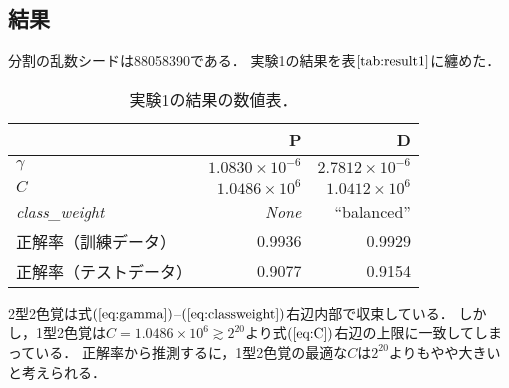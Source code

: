 \documentclass[uplatex,paper=a4,fontsize=4.0truemm,jafontsize=4.0truemm,head_space=30.0truemm,baselineskip=8.0truemm,gutter=25.0truemm,oneside,fleqn,hanging_panctuation,open_bracket_pos=nibu_tentsuki,dvipdfmx,jis2004,book,titlepage]{jlreq}
\theoremstyle{mystyle}
\newcommand{\tableinput}[4]{\begin{table}[tbp]\centering\caption{#3．}\label{tab:#4}\begin{tabular}{#1}#2\end{tabular}\end{table}}
\newcommand{\mathdisplaystyle}[1]{\(\displaystyle{#1}\)}
\newcommand{\Reference}[1]{\mathdisplaystyle{\ref{#1}}}
\newcommand{\Equationreference}[1]{\mathdisplaystyle{\parentheses{\ref{#1}}}}
\newcommand{\parentheses}[1]{\left(#1\right)}
\begin{document}
			\subsection{結果}
				分割の乱数シードは88058390である．
				実験1の結果を表\Reference{tab:result1}に纏めた．
				\tableinput{l|rr}{ & P & D \\ \hline
					\mathdisplaystyle{\gamma} & \mathdisplaystyle{1.0830\times{10}^{-6}} & \mathdisplaystyle{2.7812\times{10}^{-6}} \\
					\mathdisplaystyle{C} & \mathdisplaystyle{1.0486\times{10}^6} & \mathdisplaystyle{1.0412\times{10}^6} \\
					\textit{class\_weight} & \textit{None} & ``balanced'' \\
					正解率（訓練データ） & 0.9936 & 0.9929 \\
					正解率（テストデータ） & 0.9077 & 0.9154}{実験1の結果の数値表}{result1}

				2型2色覚は式\Equationreference{eq:gamma}--\Equationreference{eq:classweight}右辺内部で収束している．
				しかし，1型2色覚は\mathdisplaystyle{C=1.0486\times10^6\gtrsim2^{20}}より式\Equationreference{eq:C}右辺の上限に一致してしまっている．
				正解率から推測するに，1型2色覚の最適な\mathdisplaystyle{C}は\mathdisplaystyle{2^{20}}よりもやや大きいと考えられる．
\end{document}
